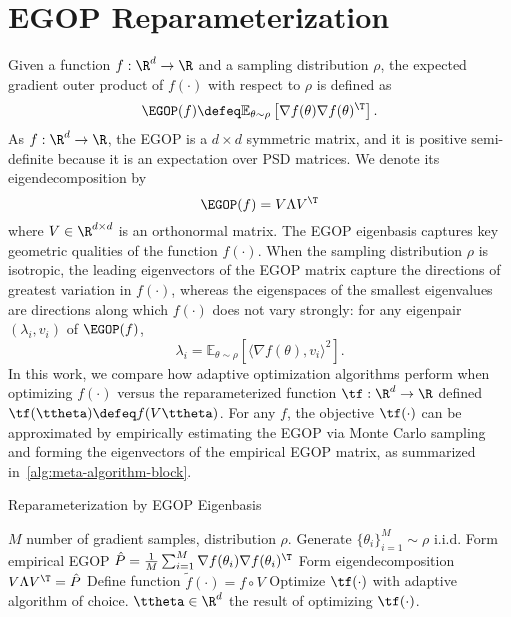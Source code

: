 \documentclass{article}
\begin{document}
\section{EGOP Reparameterization}\label{sec:EGOP-defn}

    Given a function $f:\R^d\rightarrow \R$ and a sampling distribution $\rho$, the expected gradient outer product of $f(\cdot)$ with respect to $\rho$ is defined as
    \[
        \EGOP(f) \defeq \mathbb{E}_{\theta\sim \rho}\left[\nabla f(\theta)\nabla f(\theta)^{\T}\right].
    \]
    As $f:\R^d\rightarrow \R$, the EGOP is a $d\times d$ symmetric matrix, and it is positive semi-definite because it is an expectation over PSD matrices. We denote its eigendecomposition by
    \[
        \EGOP(f) = V \Lambda V^{\T}
    \]
    where $V\in \R^{d\times d}$ is an orthonormal matrix. The EGOP eigenbasis captures key geometric qualities of the function $f(\cdot)$. When the sampling distribution $\rho$ is isotropic, the leading eigenvectors of the EGOP matrix capture the directions of greatest variation in $f(\cdot)$, whereas the eigenspaces of the smallest eigenvalues are directions along which $f(\cdot)$ does not vary strongly: for any eigenpair
    $(\lambda_i, v_i)$ of $\EGOP(f)$,
    \begin{equation}\label{eq:constantine-eigvecs-identity}
        \lambda_i = \mathbb{E}_{\theta\sim\rho}[\langle \nabla f(\theta), v_i\rangle^2 ].
    \end{equation}
    In this work, we compare how adaptive optimization algorithms perform when optimizing $f(\cdot)$ versus the reparameterized function $\tf:\R^d\rightarrow \R$ defined $\tf(\ttheta)\defeq f(V\ttheta)$. For any $f$, the objective $\tf(\cdot)$ can be approximated by empirically estimating the EGOP via Monte Carlo sampling and forming the eigenvectors of the empirical EGOP matrix, as summarized in~\cref{alg:meta-algorithm-block}.

    \begin{algorithm}[h]
       \caption{Reparameterization by EGOP Eigenbasis}
       \label{alg:meta-algorithm-block}
    \begin{algorithmic}
        $M$ number of gradient samples, distribution $\rho$.
       \STATE Generate $\{\theta_i\}_{i=1}^M \sim \rho$ i.i.d.
       \STATE Form empirical EGOP $\hat{P} = \frac{1}{M}\sum_{i=1}^M \nabla f(\theta_i)\nabla f(\theta_i)^\T$
       \STATE Form eigendecomposition $V\Lambda V^\T = \hat{P}$
       \STATE Define function $\tilde{f}(\cdot) = f\circ V$
       \STATE Optimize $\tf(\cdot)$ with adaptive algorithm of choice.
        $\ttheta \in \R^d$ the result of optimizing $\tf(\cdot)$.
    \end{algorithmic}
    \end{algorithm}
\end{document}
